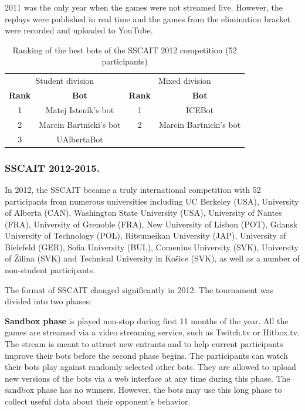 \documentclass{llncs}
\begin{document}
2011 was the only year when the games were not streamed live. However, the replays were published in real time and the games from the elimination bracket were recorded and uploaded to YouTube.

\begin{table}[!t]
\caption{Ranking of the best bots of the SSCAIT 2012 competition (52 participants)}
\label{tab:sscait2012}
\centering
\begin{tabular}{|c|c|c|c|}
\hline
\multicolumn{2}{|c|}{Student division} & \multicolumn{2}{|c|}{Mixed division}\\
{\bfseries Rank} & {\bfseries Bot} & {\bfseries Rank} & {\bfseries Bot} \\
\hline
1 & Matej Isten\'{i}k's bot & 1 & ICEBot \\
2 & Marcin Bartnicki's bot  & 2 & Marcin Bartnicki's bot \\
3 & UAlbertaBot 			&   &  \\
\hline
\end{tabular}
\end{table}


\subsubsection{SSCAIT 2012-2015.}
In 2012, the SSCAIT became a truly international competition with 52 participants from numerous universities including 
UC Berkeley (USA), University of Alberta (CAN), Washington State University (USA), University of Nantes (FRA), University of Grenoble (FRA), New University of Lisbon (POT), Gdansk University of Technology (POL), Ritsumeikan University (JAP), University of Bielefeld (GER), Sofia University (BUL), Comenius University (SVK), University of \v{Z}ilina (SVK) and Technical University in Ko\v{s}ice (SVK), as well as a number of non-student participants. 

The format of SSCAIT changed significantly in 2012. The tournament was divided into two phases:

\textbf{{Sandbox phase}} is played non-stop during first 11 months of the year. All the games are streamed via a video streaming service, such as Twitch.tv or Hitbox.tv. The stream is meant to attract new entrants and to help current participants improve their bots before the second phase begins. The participants can watch their bots play against randomly selected other bots. They are allowed to upload new versions of the bots via a web interface at any time during this phase. The  sandbox phase has no winners. However, the bots may use this long phase to collect useful data about their opponent's behavior. 
\end{document}
